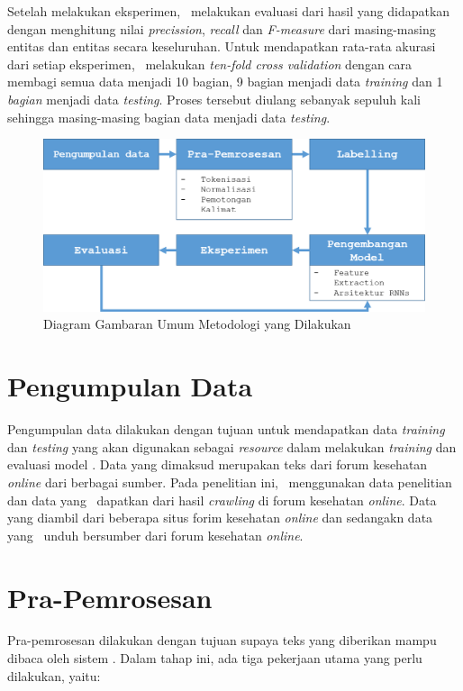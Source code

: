 Setelah melakukan eksperimen, \saya~melakukan evaluasi dari hasil yang didapatkan dengan menghitung nilai \textit{precission}, \textit{recall} dan \textit{F-measure} dari masing-masing entitas dan entitas secara keseluruhan. Untuk mendapatkan rata-rata akurasi dari setiap eksperimen, \saya~melakukan \textit{ten-fold cross validation} dengan cara membagi semua data menjadi 10 bagian, 9 bagian menjadi data \textit{training} dan 1 \textit{bagian} menjadi data \textit{testing}. Proses tersebut diulang sebanyak sepuluh kali sehingga masing-masing bagian data menjadi data \textit{testing}.
\begin{figure}
  \centering
  \includegraphics[width=\linewidth]{images/arsitektur}
  \caption{Diagram Gambaran Umum Metodologi yang Dilakukan}
  \label{fig:metodologi_penelitian}
\end{figure}

\section{Pengumpulan Data}
Pengumpulan data dilakukan dengan tujuan untuk mendapatkan data \textit{training} dan \textit{testing} yang akan digunakan sebagai \textit{resource} dalam melakukan \textit{training} dan evaluasi model \mer. Data yang dimaksud merupakan teks dari forum kesehatan \textit{online} dari berbagai sumber. Pada penelitian ini, \saya~menggunakan data penelitian \cite{skripsiKakRadit} dan data yang \saya~dapatkan dari hasil \textit{crawling} di forum kesehatan \textit{online}. Data yang \cite{skripsiKakRadit} diambil dari beberapa situs forim kesehatan \textit{online} dan sedangakn data yang \saya~unduh bersumber dari forum kesehatan \textit{online}.

\section{Pra-Pemrosesan}
Pra-pemrosesan dilakukan dengan tujuan supaya teks yang diberikan mampu dibaca oleh sistem \mer. Dalam tahap ini, ada tiga pekerjaan utama yang perlu dilakukan, yaitu:


